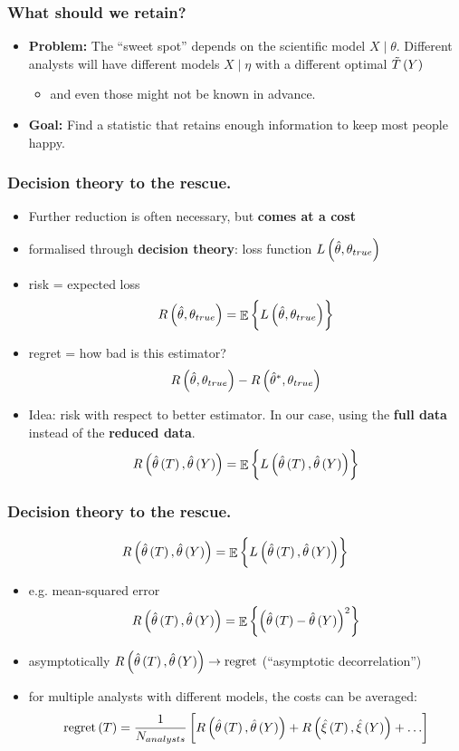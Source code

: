 \documentclass[10pt, compress]{beamer}
\DeclareMathOperator{\E}{\mathbb{E}}
\newcommand{\that}{\hat{\theta}}
\begin{document}
\begin{frame}[fragile]
    \frametitle{What should we retain?}
    \begin{itemize}
        \item \textbf{Problem:} The “sweet spot” depends on the scientific model $X \mid \theta$. Different analysts will have different models $X \mid \eta$ with a different optimal $\tilde{T}\del{Y}$
            \begin{itemize}
                \item and even those might not be known in advance.
            \end{itemize}
        \item \textbf{Goal:} Find a statistic that retains enough information to keep most people happy.
    \end{itemize}
\end{frame}

\begin{frame}[fragile]
    \frametitle{Decision theory to the rescue.}
    \begin{itemize}
        \item Further reduction is often necessary, but \textbf{comes at a cost}
        \item formalised through \textbf{decision theory}: loss function $L\del{ \hat{\theta}, \theta_{true}}$
        \item risk = expected loss 
            \[ 
                R\del{\hat{\theta},\theta_{true}} = \E{\cbr{L\del{ \hat{\theta}, \theta_{true}}}}
            \]
        \item regret = how bad is this estimator?
            \[
                R\del{\hat{\theta},\theta_{true}} - R\del{\hat{\theta}^*,\theta_{true}}
            \]
        \item Idea: risk with respect to better estimator. In our case, using the \textbf{full data} instead of the \textbf{reduced data}.
                \[
                    R\del{\that\del{T},\that\del{Y}} = \E{\cbr{L\del{ \that\del{T},\that\del{Y} }}}
                \]
    \end{itemize}
\end{frame}
\begin{frame}[fragile]
    \frametitle{Decision theory to the rescue.}
        \[
                R\del{\that\del{T},\that\del{Y}} = \E{\cbr{L\del{ \that\del{T},\that\del{Y} }}}
        \]
    \begin{itemize}
        \item e.g. mean-squared error
            \[
            R\del{\that\del{T},\that\del{Y}} = \E{\cbr{ \del{ \that\del{T}-\that\del{Y} }^2 }} 
            \]
        \item asymptotically $R\del{\that\del{T},\that\del{Y}} \rightarrow \mathrm{regret}$ (“asymptotic decorrelation”)
        \item for multiple analysts with different models, the costs can be averaged:
            \[
                \mathrm{regret}\del{T} = \frac{1}{N_{analysts}}\sbr{R\del{\that\del{T},\that\del{Y}}+R\del{\hat{\xi}\del{T},\hat{\xi}\del{Y}}+\ldots}
            \]
    \end{itemize}
\end{frame}
\end{document}
